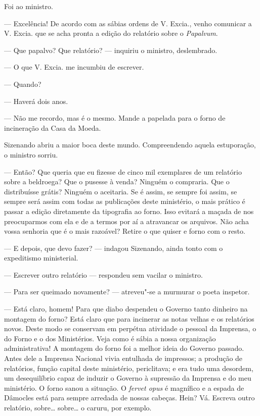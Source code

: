 Foi ao ministro.

--- Excelência! De acordo com as sábias ordens de V. Excia., venho
comunicar a V. Excia. que se acha pronta a edição do relatório sobre o
\emph{Papalvum}.

--- Que papalvo? Que relatório? --- inquiriu o ministro, deslembrado.

--- O que V. Excia. me incumbiu de escrever.

--- Quando?

--- Haverá dois anos.

--- Não me recordo, mas é o mesmo. Mande a papelada para o forno de
incineração da Casa da Moeda.

Sizenando abriu a maior boca deste mundo. Compreendendo aquela
estuporação, o ministro sorriu.

--- Então? Que queria que eu fizesse de cinco mil exemplares de um
relatório sobre a beldroega? Que o pusesse à venda? Ninguém o compraria.
Que o distribuísse grátis? Ninguém o aceitaria. Se é assim, se sempre
foi assim, se sempre será assim com todas as publicações deste
ministério, o mais prático é passar a edição diretamente da tipografia
ao forno. Isso evitará a maçada de nos preocuparmos com ela e de a
termos por aí a atravancar os arquivos. Não acha vossa senhoria que é o
mais razoável? Retire o que quiser e forno com o resto.

--- E depois, que devo fazer? --- indagou Sizenando, ainda tonto com o
expeditismo ministerial.

--- Escrever outro relatório --- respondeu sem vacilar o ministro.

--- Para ser queimado novamente? --- atreveu"-se a murmurar o poeta
inspetor.

--- Está claro, homem! Para que diabo despendeu o Governo tanto dinheiro
na montagem do forno? Está claro que para incinerar as notas velhas e os
relatórios novos. Deste modo se conservam em perpétua atividade o
pessoal da Imprensa, o do Forno e o dos Ministérios. Veja como é sábia a
nossa organização administrativa! A montagem do forno foi a melhor ideia
do Governo passado. Antes dele a Imprensa Nacional vivia entulhada de
impressos; a produção de relatórios, função capital deste ministério,
periclitava; e era tudo uma desordem, um desequilíbrio capaz de induzir
o Governo à supressão da Imprensa e do meu ministério. O forno sanou a
situação. O \emph{fervet opus} é magnífico e a espada de Dâmocles está
para sempre arredada de nossas cabeças. Hein? Vá. Escreva outro
relatório, sobre\ldots{} sobre\ldots{} o caruru, por exemplo.

